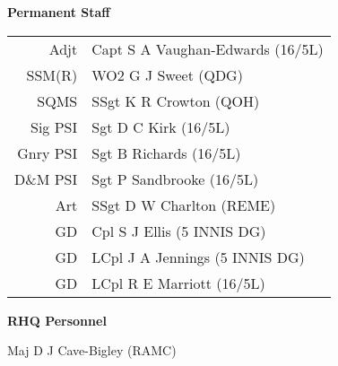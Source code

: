 \begin{center}
  \Large
  \textbf{Permanent Staff}
\end{center}

\begin{center}
  \begin{tabular}{rl}
    Adjt & Capt S A Vaughan-Edwards (16/5L) \\
    SSM(R) & WO2 G J Sweet (QDG) \\
    SQMS & SSgt K R Crowton (QOH) \\
    Sig PSI & Sgt D C Kirk (16/5L) \\
    Gnry PSI & Sgt B Richards (16/5L) \\
    D\&M PSI & Sgt P Sandbrooke (16/5L) \\
    Art & SSgt D W Charlton (REME) \\
    GD & Cpl S J Ellis (5 INNIS DG) \\
    GD & LCpl J A Jennings (5 INNIS DG) \\
    GD & LCpl R E Marriott (16/5L) \\
  \end{tabular}
\end{center}

\begin{center}
  \Large
  \textbf{RHQ Personnel}
\end{center}

\begin{multicols}{2}
  \noindent
  Maj D J Cave-Bigley (RAMC) \\
\end{multicols}
